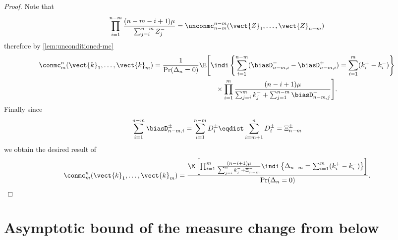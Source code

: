 \begin{proof}
    Note that
    \begin{equation*}
        \prod_{i=1}^{n-m} \frac{(n - m - i + 1) \mu}{\sum_{j=i}^{n - m} Z_j^-} = \unconmc^{n-m}_{n-m}(\vect{Z}_1, \ldots, \vect{Z}_{n-m})
    \end{equation*}
    therefore by \cref{lem:unconditioned-mc}
    \begin{align*}
        \conmc^n_m(\vect{k}_1, \ldots, \vect{k}_m)
        &= \frac{1}{\Pr(\Delta_n = 0)}\E\Bigg[ \indi\left\{ \sum_{i=1}^{n-m} (\biasD_{n-m, i}^- - \biasD_{n-m, i}^+) = \sum_{i=1}^m (k^+_i - k^-_i)\right\} \nonumber \\
        &\hspace{9em} \times \prod_{i=1}^m \frac{(n - i + 1)\mu}{\sum_{j=i}^m k_j^- + \sum_{j = 1}^{n -m} \biasD_{n-m, j}^-} \Bigg].
    \end{align*}
    Finally since
    \begin{equation*}
        \sum_{i=1}^{n-m} \biasD^{\pm}_{n-m, i} = \sum_{i=1}^{n-m} D^{\pm}_i \eqdist \sum_{i=m+1}^n D^{\pm}_i = \Xi_{n-m}^{\pm}
    \end{equation*}
    we obtain the desired result of
    \begin{equation*}
        \conmc^n_m(\vect{k}_1, \ldots, \vect{k}_m) = \frac{
        \E \left[ \prod_{i=1}^m \frac{(n - i + 1)\mu}{\sum_{j=i}^n k_j^- + \Xi^-_{n - m}}
        \indi \left\{ \Delta_{n-m} = \sum_{i=1}^m (k^+_i - k^-_i) \right\}\right]
        }{\Pr(\Delta_n = 0)}.
    \end{equation*}
\end{proof}

\section{Asymptotic bound of the measure change from below}

